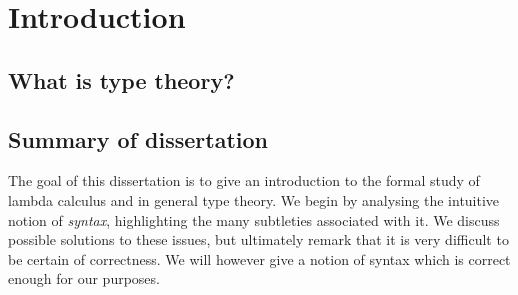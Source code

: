 \begin{comment}
\section{Introduction}

The goal of this thesis is to introduce dependent types to the undergraduate reader. We set out 

The goal of this dissertation is to learn how to mathematically design a programming language. 


The aim of this thesis is to introduce the notion of dependent types to an undergraduate reader. The main idea of dependent types is very simple, yet deceptively subtle however, since modelling such a formalism is quite tricky. This is evidenced by the fact that there is a lot of disagreement in type theory what has or hasn't been proven. This however is a familiar story in mathematics and is usually remedied by trying to understand what has been done better. Usually with the help of a new perspective. 

Dependent types however, are not only of interest to mathematicians but also programmers. Dependent type theory (much like simply typed lambda calculus) is very much a programming language allowing the expression of ideas previously too difficult to express. This is very much facilitated by its deep connection to predicate logic.
\end{comment}

\section{Introduction}

\subsection{What is type theory?}

\subsection{Summary of dissertation}

The goal of this dissertation is to give an introduction to the formal study of lambda calculus and in general type theory. We begin by analysing the intuitive notion of \emph{syntax}, highlighting the many subtleties associated with it. We discuss possible solutions to these issues, but ultimately remark that it is very difficult to be certain of correctness. We will however give a notion of syntax which is correct enough for our purposes.

